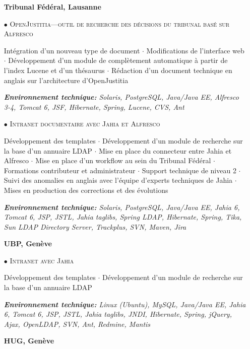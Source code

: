 \documentclass[11pt,a4paper]{moderncv}
\begin{document}
\begin{itemize}
		
	\item[] \textbf{Tribunal Fédéral, Lausanne}
	
	\item[$\bullet$] \textsc{OpenJustitia---outil de recherche des décisions du tribunal basé sur Alfresco}
	\item[] Intégration d'un nouveau type de document $\cdot$ Modifications de l'interface web $\cdot$ Développement d'un module de complètement automatique à partir de l'index Lucene et d'un thésaurus $\cdot$ Rédaction d'un document technique en anglais sur l'architecture d'OpenJustitia 	
	\item[] \emph{\textbf{Environnement technique:} Solaris, PostgreSQL, Java/Java EE, Alfresco 3-4, Tomcat 6, JSF, Hibernate, Spring, Lucene, CVS, Ant}
	      	      	      	
	\item[$\bullet$] \textsc{Intranet documentaire avec Jahia et Alfresco}
	\item[] Développement des templates $\cdot$ Développement d'un module de recherche sur la base d'un annuaire LDAP $\cdot$ Mise en place du connecteur entre Jahia et Alfresco $\cdot$ Mise en place d'un workflow au sein du Tribunal Fédéral $\cdot$ Formations contributeur et administrateur $\cdot$ Support technique de niveau 2 $\cdot$ Suivi des anomalies en anglais avec l'équipe d'experts techniques de Jahia $\cdot$ Mises en production des corrections et des évolutions
	\item[] \emph{\textbf{Environnement technique:} Solaris, PostgreSQL, Java/Java EE, Jahia 6, Tomcat 6, JSP, JSTL, Jahia taglibs, Spring LDAP, Hibernate, Spring, Tika, Sun LDAP Directory Server, Trackplus, SVN, Maven, Jira}
	      	      	      	
	\item[] \textbf{UBP, Genève}
	
	\item[$\bullet$] \textsc{Intranet avec Jahia}
	\item[] Développement des templates $\cdot$ Développement d'un module de recherche sur la base d'un annuaire LDAP
	\item[] \emph{\textbf{Environnement technique:} Linux (Ubuntu), MySQL, Java/Java EE, Jahia 6, Tomcat 6, 	 JSP, JSTL, Jahia taglibs, JNDI, Hibernate, Spring, jQuery, Ajax, OpenLDAP, SVN, Ant, Redmine, Mantis}
	      	      	      	
	\item[] \textbf{HUG, Genève}
	

\end{itemize}
\end{document}
